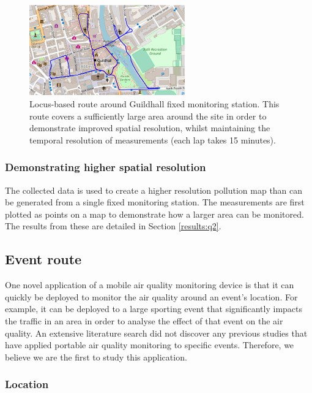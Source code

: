 \documentclass[11pt,twosided,a4paper]{report}
\begin{document}
\begin{figure}[!tb]
\centering
\includegraphics[width=0.6\textwidth]{images/locus_route}
\caption[Locus-based route.]{Locus-based route around Guildhall fixed monitoring station. This route covers a sufficiently large area around the site in order to demonstrate improved spatial resolution, whilst maintaining the temporal resolution of measurements (each lap takes 15 minutes).}
\label{fig: locus_route}
\end{figure}

\subsubsection{Demonstrating higher spatial resolution}

The collected data is used to create a higher resolution pollution map than can be generated from a single fixed monitoring station. The measurements are first plotted as points on a map to demonstrate how a larger area can be monitored. The results from these are detailed in Section \ref{results:q2}. %


\subsection{Event route} \label{sec:event}

One novel application of a mobile air quality monitoring device is that it can quickly be deployed to monitor the air quality around an event's location. For example, it can be deployed to a large sporting event that significantly impacts the traffic in an area in order to analyse the effect of that event on the air quality. An extensive literature search did not discover any previous studies that have applied portable air quality monitoring to specific events. Therefore, we believe we are the first to study this application.

\subsubsection{Location}
\end{document}

